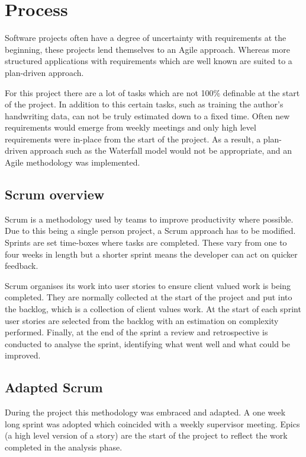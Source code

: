\section{Process}
Software projects often have a degree of uncertainty with requirements at the beginning, these projects lend themselves to an Agile approach. Whereas more structured applications with requirements which are well known are suited to a plan-driven approach.

For this project there are a lot of tasks which are not 100\% definable at the start of the project. In addition to this certain tasks, such as training the author's handwriting data, can not be truly estimated down to a fixed time. Often new requirements would emerge from weekly meetings and only high level requirements were in-place from the start of the project. As a result, a plan-driven approach such as the Waterfall model would not be appropriate, and an Agile methodology was implemented.

\subsection{Scrum overview}
Scrum \cite{citeulike:14014350} is a methodology used by teams to improve productivity where possible. Due to this being a single person project, a Scrum approach has to be modified. Sprints are set time-boxes where tasks are completed. These vary from one to four weeks in length but a shorter sprint means the developer can act on quicker feedback.

Scrum organises its work into user stories to ensure client valued work is being completed. They are normally collected at the start of the project and put into the backlog, which is a collection of client values work. At the start of each sprint user stories are selected from the backlog with an estimation on complexity performed. Finally, at the end of the sprint a review and retrospective is conducted to analyse the sprint, identifying what went well and what could be improved.

\subsection{Adapted Scrum}
During the project this methodology was embraced and adapted. A one week long sprint was adopted which coincided with a weekly supervisor meeting. Epics (a high level version of a story) are the start of the project to reflect the work completed in the analysis phase.


